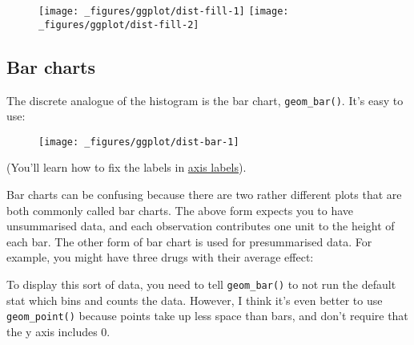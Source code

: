 \begin{figure}[H]
  \texttt{[image: \_figures/ggplot/dist-fill-1]}%
  \texttt{[image: \_figures/ggplot/dist-fill-2]}
\end{figure}

\hypertarget{sub:bar}{%
\subsection{Bar charts}\label{sub:bar}}

The discrete analogue of the histogram is the bar chart,
\texttt{geom\_bar()}. It's easy to use: 

\begin{Shaded}
\begin{Highlighting}[]
\OperatorTok{+}\StringTok{ }
\StringTok{  }\NormalTok{()}
\end{Highlighting}
\end{Shaded}

\begin{figure}[H]
  \texttt{[image: \_figures/ggplot/dist-bar-1]}
\end{figure}

(You'll learn how to fix the labels in
\protect\hyperlink{sub:theme-axis}{axis labels}).

Bar charts can be confusing because there are two rather different plots
that are both commonly called bar charts. The above form expects you to
have unsummarised data, and each observation contributes one unit to the
height of each bar. The other form of bar chart is used for
presummarised data. For example, you might have three drugs with their
average effect:

\begin{Shaded}
\begin{Highlighting}[]
\StringTok{ }\NormalTok{(}
   \NormalTok{(}\NormalTok{, }\NormalTok{, }\NormalTok{),}
   \NormalTok{(}\NormalTok{, }\NormalTok{, }\NormalTok{)}
\NormalTok{)}
\end{Highlighting}
\end{Shaded}

To display this sort of data, you need to tell \texttt{geom\_bar()} to
not run the default stat which bins and counts the data. However, I
think it's even better to use \texttt{geom\_point()} because points take
up less space than bars, and don't require that the y axis includes 0.

